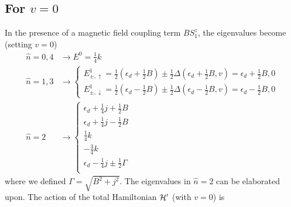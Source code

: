 \documentclass[12pt,twoside]{report}
\numberwithin{equation}{section}
\begin{document}
\subsection{For \(v=0\)}
In the presence of a magnetic field coupling term \(B S^z_1\), the eigenvalues become (setting \(v = 0\))
\begin{equation}\begin{aligned}
\hat n=0,4 &\rightarrow E^0 = \frac{1}{4}k\\
\hat n=1,3 &\rightarrow \begin{cases}
	E^1_{\pm, \uparrow} = \frac{1}{2} \left(\epsilon_d + \frac{1}{2}B\right) \pm \frac{1}{2}\Delta\left(\epsilon_d + \frac{1}{2}B, v\right)  = \epsilon_d + \frac{1}{2}B, 0\\ 
	E^1_{\pm, \downarrow} = \frac{1}{2} \left(\epsilon_d - \frac{1}{2}B\right) \pm \frac{1}{2}\Delta\left(\epsilon_d - \frac{1}{2}B, v\right)  = \epsilon_d -\frac{1}{2}B, 0
	\end{cases}\\
	\hat n=2 &\rightarrow \begin{cases}
	\epsilon_d + \frac{1}{4}j + \frac{1}{2}B\\
	\epsilon_d + \frac{1}{4}j - \frac{1}{2}B\\
	\frac{1}{4}k \\
	-\frac{3}{4}k \\
	\epsilon_d -\frac{1}{4}j \pm \frac{1}{2} \Gamma \\
\end{cases}
\end{aligned}\end{equation}
where we defined \(\Gamma = \sqrt{B^2 + j^2}\). The eigenvalues in \(\hat n=2\) can be elaborated upon. The action of the total Hamiltonian \(\mathcal{H}^\prime\) (with \(v=0\)) is
\end{document}
